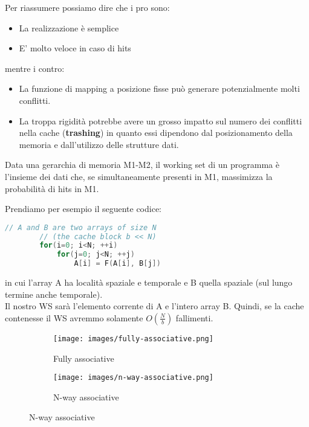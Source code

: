 \noindent Per riassumere possiamo dire che i pro sono:
\begin{itemize}
    \item La realizzazione è semplice
    \item E' molto veloce in caso di hits
\end{itemize}
mentre i contro:
\begin{itemize}
    \item La funzione di mapping a posizione fisse può generare potenzialmente molti conflitti.
    \item La troppa rigidità potrebbe avere un grosso impatto sul numero dei conflitti nella cache (\textbf{trashing}) in quanto essi dipendono dal posizionamento della memoria e dall'utilizzo delle strutture dati.
\end{itemize}

\begin{definition}
	Data una gerarchia di memoria M1-M2, il working set di un programma è l'insieme dei dati che, se simultaneamente presenti in M1, massimizza la probabilità di hits in M1.
\end{definition}

\begin{example}
	Prendiamo per esempio il seguente codice:
	\begin{lstlisting}[language=C]
		// A and B are two arrays of size N
		// (the cache block b << N)
		for(i=0; i<N; ++i)
			for(j=0; j<N; ++j)
				A[i] = F(A[i], B[j])
	\end{lstlisting}
	in cui l'array A ha località spaziale e temporale e B quella spaziale (sul lungo termine anche temporale).\\
	Il nostro WS sarà l'elemento corrente di A e l'intero array B. Quindi, se la cache contenesse il WS avremmo solamente $O(\frac{N}{b})$ fallimenti.
\end{example}

\begin{figure}[h!]
    \centering
    \begin{subfigure}{.45\textwidth}
        \centering
        \texttt{[image: images/fully-associative.png]}
        \caption{Fully associative}
    \end{subfigure}
    \begin{subfigure}{.45\textwidth}
        \centering
        \texttt{[image: images/n-way-associative.png]}
        \caption{N-way associative}
    \end{subfigure}
\end{figure}


